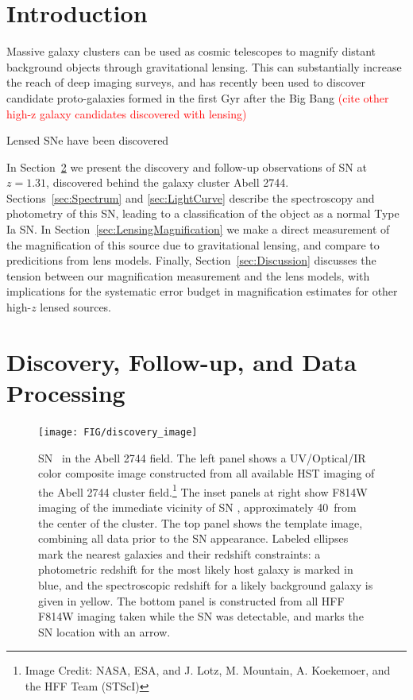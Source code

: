 
\section{Introduction}
\label{sec:Introduction}

Massive galaxy clusters can be used as cosmic telescopes to magnify
distant background objects through gravitational lensing.  This can
substantially increase the reach of deep imaging surveys, and has
recently been used to discover candidate proto-galaxies formed in the
first Gyr after the Big
Bang \citep{Zheng:2012,Coe:2013,} 
\textcolor{red}{(cite other high-z galaxy candidates discovered with lensing)}

Lensed SNe have been discovered
\citep{Goobar:2009,Riehm:2011,Patel:2014,Nordin:2014}

In Section~\ref{sec:DiscoveryAndFollowup} we present the discovery and
follow-up observations of SN \tomas at $z=1.31$, discovered behind the
galaxy cluster Abell 2744.  Sections~\ref{sec:Spectrum} and \ref{sec:LightCurve}
describe the spectroscopy and photometry of this SN, leading to a
classification of the object as a normal Type Ia SN.  In
Section~\ref{sec:LensingMagnification} we make a direct measurement of
the magnification of this source due to gravitational lensing, and
compare to predicitions from lens models.  Finally,
Section~\ref{sec:Discussion} discusses the tension between our
magnification measurement and the lens models, with implications for
the systematic error budget in magnification estimates for other
high-$z$ lensed sources.


\section{Discovery, Follow-up, and Data Processing}
\label{sec:DiscoveryAndFollowup}

\begin{figure}
\begin{center}
\texttt{[image: FIG/discovery\_image]}
\caption{  \label{fig:DiscoveryImage}
SN \tomas\ in the Abell 2744 field.  The left panel shows a
UV/Optical/IR color composite image constructed from all available HST
imaging of the Abell 2744 cluster field.\footnote{Image Credit: NASA,
ESA, and J. Lotz, M. Mountain, A. Koekemoer, and the HFF Team
(STScI)}  The inset panels at right show F814W imaging of the
immediate vicinity of SN \tomas, approximately 40\arcsec\ from the
center of the cluster.  The top panel shows the template image,
combining all data prior to the SN appearance.  Labeled ellipses mark the nearest galaxies and their redshift constraints: a photometric redshift for the most likely host galaxy is marked in blue, and the spectroscopic redshift for a likely background galaxy is given in yellow. The bottom panel is
constructed from all HFF F814W imaging taken while the SN was detectable, and marks the SN location with an arrow.}
\end{center}
\end{figure}


